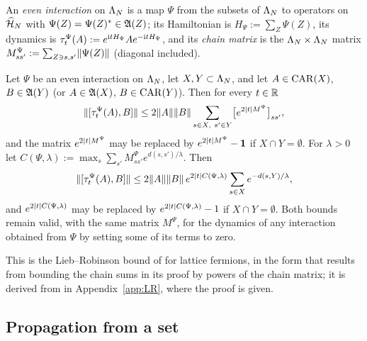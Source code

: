 An \emph{even interaction} on $\Lambda_N$ is a map $\Psi$ from the subsets of $\Lambda_N$ to operators on $\widehat{\mathcal{H}}_N$ with
$\Psi(Z)=\Psi(Z)^*\in\mathfrak{A}(Z)$; its Hamiltonian is $H_\Psi:=\sum_Z\Psi(Z)$, its dynamics is
$\tau^\Psi_t(A):=e^{\mathrm{i} tH_\Psi}Ae^{-\mathrm{i} tH_\Psi}$, and its \emph{chain matrix} is the
$\Lambda_N\times\Lambda_N$ matrix $M^\Psi_{ss'}:=\sum_{Z\ni s,s'}\lVert\Psi(Z)\rVert$ (diagonal included).

\begin{theorem}\label{thm:LR}
Let $\Psi$ be an even interaction on $\Lambda_N$, let $X,Y\subset\Lambda_N$, and let $A\in\mathrm{CAR}(X)$, $B\in\mathfrak{A}(Y)$ (or
$A\in\mathfrak{A}(X)$, $B\in\mathrm{CAR}(Y)$). Then for every $t\in\mathbb{R}$
\[
\lVert[\tau^\Psi_t(A),B]\rVert\le2\lVert A\rVert\lVert B\rVert\sum_{s\in X,\ s'\in Y}\bigl[e^{2\lvert t\rvert M^\Psi}\bigr]_{ss'},
\]
and the matrix $e^{2\lvert t\rvert M^\Psi}$ may be replaced by $e^{2\lvert t\rvert M^\Psi}-\mathbf{1}$ if $X\cap Y=\emptyset$. For
$\lambda>0$ let
$C(\Psi,\lambda):=\max_s\sum_{s'}M^\Psi_{ss'}e^{d(s,s')/\lambda}$. Then
\[
\lVert[\tau^\Psi_t(A),B]\rVert\le2\lVert A\rVert\lVert B\rVert\,e^{2\lvert t\rvert C(\Psi,\lambda)}\sum_{s\in X}e^{-d(s,Y)/\lambda},
\]
and $e^{2\lvert t\rvert C(\Psi,\lambda)}$ may be replaced by $e^{2\lvert t\rvert C(\Psi,\lambda)}-1$ if $X\cap Y=\emptyset$. Both bounds
remain valid, with the same matrix $M^\Psi$, for the dynamics of any interaction obtained from $\Psi$ by setting
some of its terms to zero.
\end{theorem}

This is the Lieb--Robinson bound of \cite[Theorem~3.1]{NSY18} for lattice fermions, in the form that results
from bounding the chain sums in its proof by powers of the chain matrix; it is derived from
\cite[Lemma~3.3]{NSY18} in Appendix~\ref{app:LR}, where the proof is given.

\subsection{Propagation from a set}

